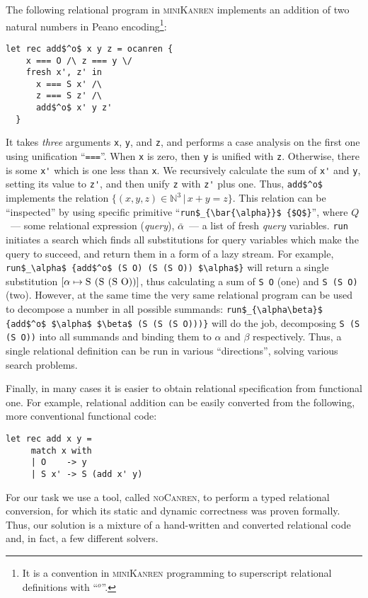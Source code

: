The following relational program in \textsc{miniKanren} implements an addition of two natural numbers in Peano encoding\footnote{It is a
convention in \textsc{miniKanren} programming to superscript relational definitions with ``$^o$''.}:

\begin{lstlisting}[language=ocanren,basicstyle=\small]
  let rec add$^o$ x y z = ocanren {
    x === O /\ z === y \/
    fresh x', z' in
      x === S x' /\
      z === S z' /\
      add$^o$ x' y z'
  }
\end{lstlisting}

It takes \emph{three} arguments \lstinline|x|, \lstinline|y|, and \lstinline|z|, and performs a
case analysis on the first one using unification ``\lstinline[language=ocanren]|===|''. When
\lstinline|x| is zero, then \lstinline|y| is unified with \lstinline|z|. Otherwise, there is some
\lstinline|x'| which is one less than \lstinline|x|. We recursively calculate the sum of \lstinline|x'| and
\lstinline|y|, setting its value to \lstinline|z'|, and then unify \lstinline|z| with \lstinline|z'| plus one. Thus,
\lstinline[mathescape=true]|add$^o$| implements the relation $\{(x, y, z)\in\mathbb{N}^3\, |\, x+y=z\}$. This relation can
be ``inspected'' by using specific primitive ``\lstinline[language=ocanren]|run$_{\bar{\alpha}}$ {$Q$}|'', where
$Q$~--- some relational expression (\emph{query}), $\bar{\alpha}$~--- a list of fresh \emph{query} variables.
\lstinline[language=ocanren]|run| initiates a search which finds all substitutions for query variables which
make the query to succeed, and return them in a form of a lazy stream. For example, \lstinline[language=ocanren,basicstyle=\small]|run$_\alpha$ {add$^o$ (S O) (S (S O)) $\alpha$}|
will return a single substitution $[\alpha\mapsto \mbox{\lstinline|S (S (S O))|}]$, thus calculating a
sum of \lstinline|S O| (one) and \lstinline|S (S O)| (two). However, at the same time the very same relational
program can be used to decompose a number in all possible summands: \lstinline[language=ocanren,basicstyle=\small]|run$_{\alpha\beta}$ {add$^o$ $\alpha$ $\beta$ (S (S (S O)))}|
will do the job, decomposing \lstinline|S (S (S O))| into all summands and binding them to $\alpha$ and $\beta$ respectively.
Thus, a single relational definition can be run in various ``directions'', solving various search problems.

Finally, in many cases it is easier to obtain relational specification from functional one. For example,
relational addition can be easily converted from the following, more conventional functional code:

\begin{lstlisting}[language=ocanren,basicstyle=\small]
   let rec add x y =
     match x with
     | O    -> y
     | S x' -> S (add x' y)
\end{lstlisting}

For our task we use a tool, called \textsc{noCanren}, to perform a typed relational conversion\cite{lozov2017typed}, for which its static and dynamic
correctness was proven formally. Thus, our solution is a mixture of a hand-written and converted relational code and, in fact, a few
different solvers.


